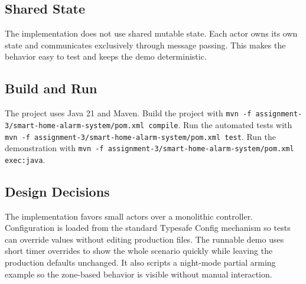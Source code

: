 \subsection{Shared State}
The implementation does not use shared mutable state.
Each actor owns its own state and communicates exclusively through message passing.
This makes the behavior easy to test and keeps the demo deterministic.

\subsection{Build and Run}
The project uses Java 21 and Maven.
Build the project with \texttt{mvn -f assignment-3/smart-home-alarm-system/pom.xml compile}.
Run the automated tests with \texttt{mvn -f assignment-3/smart-home-alarm-system/pom.xml test}.
Run the demonstration with \texttt{mvn -f assignment-3/smart-home-alarm-system/pom.xml exec:java}.

\subsection{Design Decisions}
The implementation favors small actors over a monolithic controller.
Configuration is loaded from the standard Typesafe Config mechanism so tests can override values without editing production files.
The runnable demo uses short timer overrides to show the whole scenario quickly while leaving the production defaults unchanged.
It also scripts a night-mode partial arming example so the zone-based behavior is visible without manual interaction.

